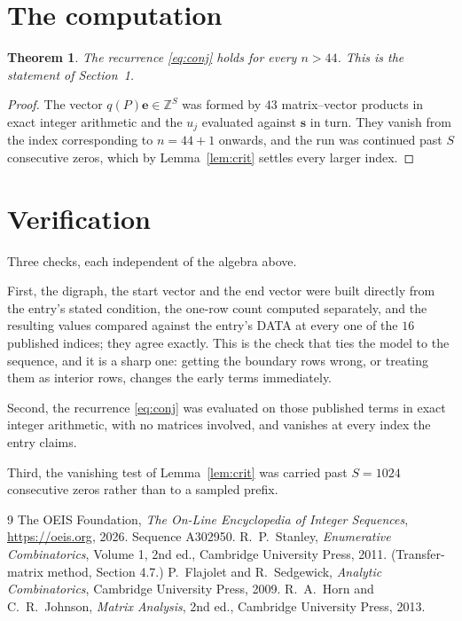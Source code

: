 \documentclass[11pt,a4paper]{article}
\theoremstyle{plain}
\newtheorem{theorem}{Theorem}
\theoremstyle{definition}
\begin{document}
\section{The computation}

\begin{theorem}
The recurrence \eqref{eq:conj} holds for every $n>44$. This is the statement of
Section~1.
\end{theorem}

\begin{proof}
The vector $q(P)\mathbf{e}\in\mathbb{Z}^{S}$ was formed by $43$ matrix--vector
products in exact integer arithmetic and the $u_j$ evaluated against $\mathbf{s}$ in turn.
They vanish from the index corresponding to $n=44+1$ onwards, and the run was continued
past $S$ consecutive zeros, which by Lemma~\ref{lem:crit} settles every larger index.
\end{proof}

\section{Verification}

Three checks, each independent of the algebra above.

First, the digraph, the start vector and the end vector were built directly from the
entry's stated condition, the one-row count computed separately, and the resulting values
compared against the entry's DATA at every one of the $16$ published indices; they
agree exactly. This is the check that ties the model to the sequence, and it is a sharp one:
getting the boundary rows wrong, or treating them as interior rows, changes the early terms
immediately.

Second, the recurrence \eqref{eq:conj} was evaluated on those published terms in exact
integer arithmetic, with no matrices involved, and vanishes at every index the entry claims.

Third, the vanishing test of Lemma~\ref{lem:crit} was carried past $S=1024$ consecutive
zeros rather than to a sampled prefix.

\begin{thebibliography}{9}
 The OEIS Foundation, \emph{The On-Line Encyclopedia of Integer
Sequences}, \url{https://oeis.org}, 2026. Sequence A302950.
 R.~P.~Stanley, \emph{Enumerative Combinatorics}, Volume 1, 2nd ed.,
Cambridge University Press, 2011. (Transfer-matrix method, Section 4.7.)
 P.~Flajolet and R.~Sedgewick, \emph{Analytic Combinatorics}, Cambridge
University Press, 2009.
 R.~A.~Horn and C.~R.~Johnson, \emph{Matrix Analysis}, 2nd ed., Cambridge
University Press, 2013.
\end{thebibliography}
\end{document}
